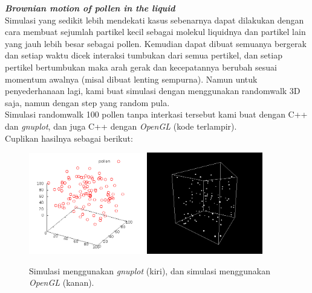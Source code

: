 \documentclass[paper=a4, fontsize=11pt]{scrartcl}
\numberwithin{equation}{section} %
\numberwithin{figure}{section} %
\numberwithin{table}{section} %
\begin{document}
\vspace{1.5cm}
\textit{\textbf{Brownian motion of pollen in the liquid}}\\
Simulasi yang sedikit lebih mendekati kasus sebenarnya dapat dilakukan dengan cara membuat sejumlah partikel kecil sebagai molekul liquidnya dan partikel lain yang jauh lebih besar sebagai pollen. Kemudian dapat dibuat semuanya bergerak dan setiap waktu dicek interaksi tumbukan dari semua pertikel, dan setiap pertikel bertumbukan maka arah gerak dan kecepatannya berubah sesuai momentum awalnya (misal dibuat lenting sempurna).
Namun untuk penyederhanaan lagi, kami buat simulasi dengan menggunakan randomwalk 3D saja, namun dengan step yang random pula.\\
Simulasi randomwalk 100 pollen tanpa interkasi tersebut kami buat dengan C++ dan \textit{gnuplot}, dan juga C++ dengan \textit{OpenGL} (kode terlampir).\\

Cuplikan hasilnya sebagai berikut:
\begin{figure}
	\centering
	\includegraphics[width=0.45\textwidth]{pollen-gplt.png}
	\includegraphics[width=0.45\textwidth]{pollen-ogl.png}
	\caption{Simulasi menggunakan \textit{gnuplot} (kiri), dan simulasi menggunakan \textit{OpenGL} (kanan).}
\end{figure}
\end{document}
